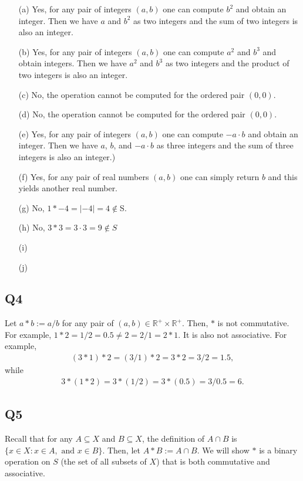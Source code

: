 \documentclass[12pt]{article}
\def\R{{\mathbb R}}        %
\numberwithin{theorem}{section}
\numberwithin{equation}{section}
\numberwithin{remark}{section}
\numberwithin{definition}{section}
\numberwithin{theorem}{section}
\numberwithin{lemma}{section}
\numberwithin{example}{section}
\begin{document}
\begin{itemize}
	\item[(a)]{Yes, for any pair of integers $(a,b)$ one can compute $b^2$ and obtain an integer. Then we have $a$ and $b^2$ as two integers and the sum of two integers is also an integer.}
	\item[(b)]{Yes, for any pair of integers $(a,b)$ one can compute $a^2$ and $b^3$ and obtain integers. Then we have $a^2$ and $b^3$ as two integers and the product of two integers is also an integer.}
	\item[(c)]{No, the operation cannot be computed for the ordered pair $(0,0)$.}
	\item[(d)]{No, the operation cannot be computed for the ordered pair $(0,0)$.}
	\item[(e)]{Yes, for any pair of integers $(a,b)$ one can compute $-a\cdot b$ and obtain an integer. Then we have $a$, $b$, and $-a\cdot b$ as three integers and the sum of three integers is also an integer.)}
	\item[(f)]{Yes, for any pair of real numbers $(a,b)$ one can simply return $b$ and this yields another real number.}
	\item[(g)]{No, $1*-4=|-4|=4\notin$S.}
	\item[(h)]{No, $3*3=3\cdot3=9\notin S$}
	\item[(i)]{}
	\item[(j)]{}
\end{itemize}



\subsection{Q4}

Let $a*b:=a/b$ for any pair of $(a,b)\in\R^+\times\R^+$. Then, $*$ is not commutative. For example, $1*2=1/2=0.5\neq2=2/1=2*1$. It is also not associative. For example, 
\begin{align*}
	(3*1)*2=(3/1)*2=3*2=3/2=1.5,
\end{align*}
while
\begin{align*}
	3*(1*2)=3*(1/2)=3*(0.5)=3/0.5=6.
\end{align*}



\subsection{Q5}

Recall that for any $A\subseteq X$ and $B\subseteq X$, the definition of $A\cap B$ is $\{x\in X: x\in A,\text{ and } x\in B\}$. Then, let $A * B:= A \cap B$. We will show $*$ is a binary operation on $S$ (the set of all subsets of $X$) that is both commutative and associative. 
\end{document}
